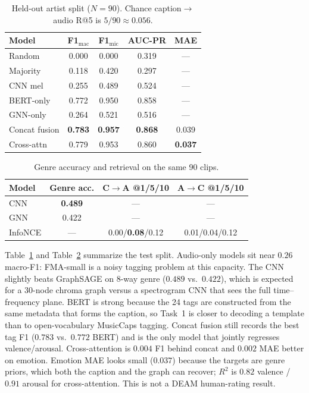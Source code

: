 \documentclass[conference]{IEEEtran}
\begin{document}
\begin{table}[t]
\caption{Held-out artist split ($N=90$). Chance caption$\to$audio R@5 is $5/90\approx 0.056$.}
\label{tab:results}
\centering
\scriptsize
\setlength{\tabcolsep}{3.2pt}
\begin{tabular}{@{}lcccc@{}}
\toprule
Model & F1$_{\mathrm{mac}}$ & F1$_{\mathrm{mic}}$ & AUC-PR & MAE \\
\midrule
Random & 0.000 & 0.000 & 0.319 & --- \\
Majority & 0.118 & 0.420 & 0.297 & --- \\
CNN mel & 0.255 & 0.489 & 0.524 & --- \\
BERT-only & 0.772 & 0.950 & 0.858 & --- \\
GNN-only & 0.264 & 0.521 & 0.516 & --- \\
Concat fusion & \textbf{0.783} & \textbf{0.957} & \textbf{0.868} & 0.039 \\
Cross-attn & 0.779 & 0.953 & 0.860 & \textbf{0.037} \\
\bottomrule
\end{tabular}
\end{table}

\begin{table}[t]
\caption{Genre accuracy and retrieval on the same 90 clips.}
\label{tab:aux}
\centering
\scriptsize
\setlength{\tabcolsep}{3pt}
\begin{tabular}{@{}lccc@{}}
\toprule
Model & Genre acc. & C$\to$A @1/5/10 & A$\to$C @1/5/10 \\
\midrule
CNN & \textbf{0.489} & --- & --- \\
GNN & 0.422 & --- & --- \\
InfoNCE & --- & 0.00/\textbf{0.08}/0.12 & 0.01/0.04/0.12 \\
\bottomrule
\end{tabular}
\end{table}

Table~\ref{tab:results} and Table~\ref{tab:aux} summarize the test split. Audio-only models sit near $0.26$ macro-F1: FMA-small is a noisy tagging problem at this capacity. The CNN slightly beats GraphSAGE on 8-way genre ($0.489$ vs.\ $0.422$), which is expected for a 30-node chroma graph versus a spectrogram CNN that sees the full time--frequency plane. BERT is strong because the 24 tags are constructed from the same metadata that forms the caption, so Task~1 is closer to decoding a template than to open-vocabulary MusicCaps tagging. Concat fusion still records the best tag F1 ($0.783$ vs.\ $0.772$ BERT) and is the only model that jointly regresses valence/arousal. Cross-attention is $0.004$ F1 behind concat and $0.002$ MAE better on emotion. Emotion MAE looks small ($0.037$) because the targets are genre priors, which both the caption and the graph can recover; $R^2$ is $0.82$ valence / $0.91$ arousal for cross-attention. This is not a DEAM human-rating result.
\end{document}
